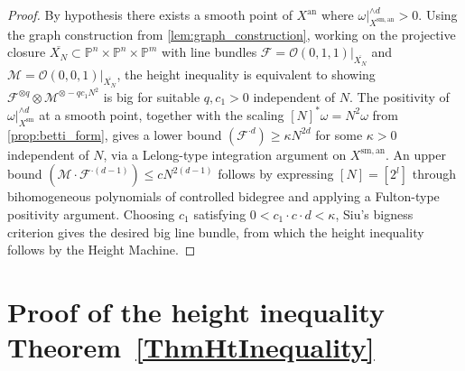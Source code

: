 \begin{proof}
  By hypothesis there exists a smooth point of \(X^{\mathrm{an}}\) where
  \(\omega|_{X^{\mathrm{sm,an}}}^{\wedge d} > 0\). Using the graph construction
  from \cref{lem:graph_construction}, working on the projective closure
  \(\overline{X_N} \subset \mathbb{P}^n \times \mathbb{P}^n \times \mathbb{P}^m\)
  with line bundles \(\mathcal{F} = \mathcal{O}(0,1,1)|_{\overline{X_N}}\) and
  \(\mathcal{M} = \mathcal{O}(0,0,1)|_{\overline{X_N}}\),
  the height inequality is equivalent to showing \(\mathcal{F}^{\otimes q} \otimes \mathcal{M}^{\otimes -qc_1 N^2}\)
  is big for suitable \(q, c_1 > 0\) independent of \(N\).
  The positivity of \(\omega|_{X^{\mathrm{sm}}}^{\wedge d}\) at a smooth point,
  together with the scaling \([N]^*\omega = N^2\omega\) from \cref{prop:betti_form},
  gives a lower bound \((\mathcal{F}^{\cdot d}) \ge \kappa N^{2d}\) for some \(\kappa > 0\)
  independent of \(N\), via a Lelong-type integration argument on \(X^{\mathrm{sm,an}}\).
  An upper bound \((\mathcal{M} \cdot \mathcal{F}^{\cdot(d-1)}) \le c N^{2(d-1)}\)
  follows by expressing \([N] = [2^l]\) through bihomogeneous polynomials of
  controlled bidegree and applying a Fulton-type positivity argument.
  Choosing \(c_1\) satisfying \(0 < c_1 \cdot c \cdot d < \kappa\), Siu's
  bigness criterion \cite[Theorem~2.2.15]{PosAlgGeom} gives the desired big
  line bundle, from which the height inequality follows by the Height Machine.
\end{proof}

\section{Proof of the height inequality Theorem~\ref{ThmHtInequality}}

